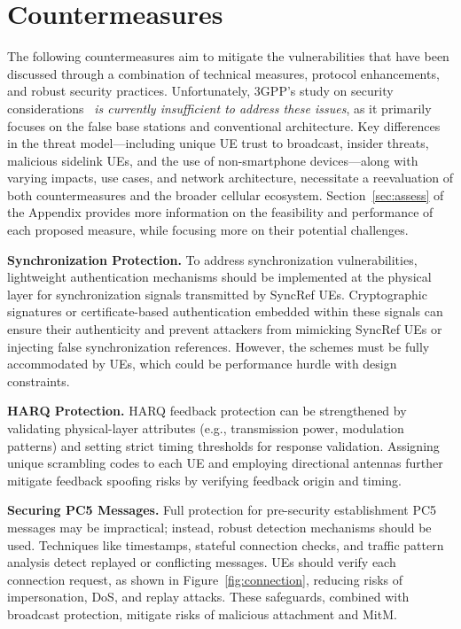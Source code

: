 \section{Countermeasures}

The following countermeasures aim to mitigate the vulnerabilities that have been discussed through a combination of technical measures, protocol enhancements, and robust security practices. Unfortunately, 3GPP's study on security considerations~\cite{3gpp.33.809} \textit{is currently insufficient to address these issues}, as it primarily focuses on the false base stations and conventional architecture. Key differences in the threat model—including unique UE trust to broadcast, insider threats, malicious sidelink UEs, and the use of non-smartphone devices—along with varying impacts, use cases, and network architecture, necessitate a reevaluation of both countermeasures and the broader cellular ecosystem. Section~\ref{sec:assess} of the Appendix provides more information on the feasibility and performance of each proposed measure, while focusing more on their potential challenges.

\textbf{Synchronization Protection.} To address synchronization vulnerabilities, lightweight authentication mechanisms should be implemented at the physical layer for synchronization signals transmitted by SyncRef UEs. Cryptographic signatures or certificate-based authentication embedded within these signals can ensure their authenticity and prevent attackers from mimicking SyncRef UEs or injecting false synchronization references. However, the schemes must be fully accommodated by UEs, which could be performance hurdle with design constraints.

\textbf{HARQ Protection.} HARQ feedback protection can be strengthened by validating physical-layer attributes (e.g., transmission power, modulation patterns) and setting strict timing thresholds for response validation. Assigning unique scrambling codes to each UE and employing directional antennas further mitigate feedback spoofing risks by verifying feedback origin and timing.

\textbf{Securing PC5 Messages.} Full protection for pre-security establishment PC5 messages may be impractical; instead, robust detection mechanisms should be used. Techniques like timestamps, stateful connection checks, and traffic pattern analysis detect replayed or conflicting messages. UEs should verify each connection request, as shown in Figure~\ref{fig:connection}, reducing risks of impersonation, DoS, and replay attacks. These safeguards, combined with broadcast protection, mitigate risks of malicious attachment and MitM.

